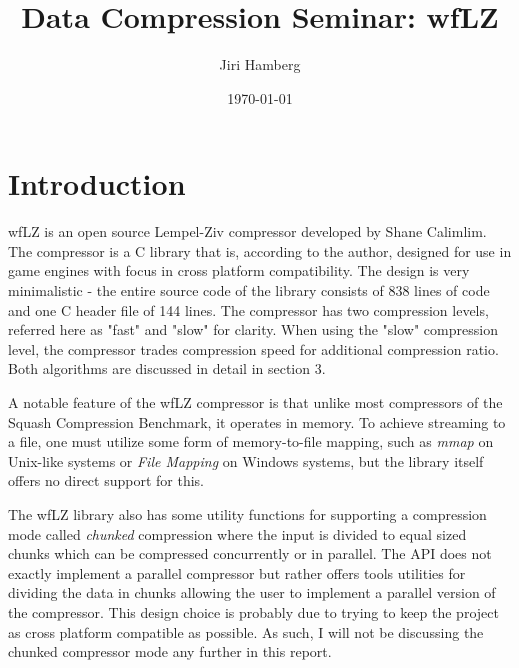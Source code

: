 \documentclass[english]{tktltiki2}
\title{Data Compression Seminar: wfLZ}
\author{Jiri Hamberg}
\date{\today}
\theoremstyle{definition}
\theoremstyle{remark}
\begin{document}

\frontmatter      %

\maketitle        %

\tableofcontents  %


\mainmatter       %

\section{Introduction}

wfLZ is an open source Lempel-Ziv compressor developed by Shane Calimlim. The compressor is a C library that is, according to the author, designed for use in game engines with focus in cross platform compatibility. The design is very minimalistic - the entire source code of the library consists of 838 lines of code and one C header file of 144 lines. The compressor has two compression levels, referred here as "fast" and "slow" for clarity. When using the "slow" compression level, the compressor trades compression speed for additional compression ratio. Both algorithms are discussed in detail in section 3.  

A notable feature of the wfLZ compressor is that unlike most compressors of the Squash Compression Benchmark, it operates in memory. To achieve streaming to a file, one must utilize some form of memory-to-file mapping, such as \textit{mmap} on Unix-like systems or \textit{File Mapping} on Windows systems, but the library itself offers no direct support for this.

The wfLZ library also has some utility functions for supporting a compression mode called \textit{chunked} compression where the input is divided to equal sized chunks which can be compressed concurrently or in parallel. The API does not exactly implement a parallel compressor but rather offers tools utilities for dividing the data in chunks allowing the user to implement a parallel version of the compressor. This design choice is probably due to trying to keep the project as cross platform compatible as possible. As such, I will not be discussing the chunked compressor mode any further in this report. 
\end{document}
